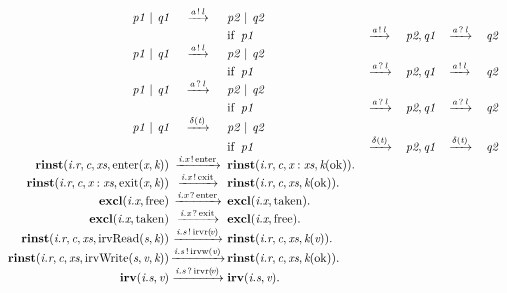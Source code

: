 \[
\begin{array}{r@{}c@{}llllll}
\Prule{\Tstep{\Tpar{\Tvar{P1}}{\Tvar{Q1}}}{\Tsay{\Tvar{A}}{\Tvar{L}}}{\Tpar{\Tvar{P2}}{\Tvar{Q2}}}}{\Tstep{\Tvar{P1}}{\Tsay{\Tvar{A}}{\Tvar{L}}}{\Tvar{P2}},\Tstep{\Tvar{Q1}}{\Thear{\Tvar{A}}{\Tvar{L}}}{\Tvar{Q2}}}
\\\Prule{\Tstep{\Tpar{\Tvar{P1}}{\Tvar{Q1}}}{\Tsay{\Tvar{A}}{\Tvar{L}}}{\Tpar{\Tvar{P2}}{\Tvar{Q2}}}}{\Tstep{\Tvar{P1}}{\Thear{\Tvar{A}}{\Tvar{L}}}{\Tvar{P2}},\Tstep{\Tvar{Q1}}{\Tsay{\Tvar{A}}{\Tvar{L}}}{\Tvar{Q2}}}
\\\Prule{\Tstep{\Tpar{\Tvar{P1}}{\Tvar{Q1}}}{\Thear{\Tvar{A}}{\Tvar{L}}}{\Tpar{\Tvar{P2}}{\Tvar{Q2}}}}{\Tstep{\Tvar{P1}}{\Thear{\Tvar{A}}{\Tvar{L}}}{\Tvar{P2}},\Tstep{\Tvar{Q1}}{\Thear{\Tvar{A}}{\Tvar{L}}}{\Tvar{Q2}}}
\\\Prule{\Tstep{\Tpar{\Tvar{P1}}{\Tvar{Q1}}}{\Tdelta{\Tvar{T}}}{\Tpar{\Tvar{P2}}{\Tvar{Q2}}}}{\Tstep{\Tvar{P1}}{\Tdelta{\Tvar{T}}}{\Tvar{P2}},\Tstep{\Tvar{Q1}}{\Tdelta{\Tvar{T}}}{\Tvar{Q2}}}
\\\Pfact{\Tstep{\Trinst{\Tr{\Tvar{R}}{\Tvar{I}}}{\Tvar{C}}{\Tvar{Xs}}{\TrteEnter{\Tvar{X}}{\Tvar{K}}}}{\Tsay{\Tx{\Tvar{X}}{\Tvar{I}}}{\Tenter}}{\Trinst{\Tr{\Tvar{R}}{\Tvar{I}}}{\Tvar{C}}{\Tcons{\Tvar{X}}{\Tvar{Xs}}}{\Tap{\Tvar{K}}{\Tok}}}}
\\\Pfact{\Tstep{\Trinst{\Tr{\Tvar{R}}{\Tvar{I}}}{\Tvar{C}}{\Tcons{\Tvar{X}}{\Tvar{Xs}}}{\TrteExit{\Tvar{X}}{\Tvar{K}}}}{\Tsay{\Tx{\Tvar{X}}{\Tvar{I}}}{\Texit}}{\Trinst{\Tr{\Tvar{R}}{\Tvar{I}}}{\Tvar{C}}{\Tvar{Xs}}{\Tap{\Tvar{K}}{\Tok}}}}
\\\Pfact{\Tstep{\Texcl{\Tx{\Tvar{X}}{\Tvar{I}}}{\Tfree}}{\Thear{\Tx{\Tvar{X}}{\Tvar{I}}}{\Tenter}}{\Texcl{\Tx{\Tvar{X}}{\Tvar{I}}}{\Ttaken}}}
\\\Pfact{\Tstep{\Texcl{\Tx{\Tvar{X}}{\Tvar{I}}}{\Ttaken}}{\Thear{\Tx{\Tvar{X}}{\Tvar{I}}}{\Texit}}{\Texcl{\Tx{\Tvar{X}}{\Tvar{I}}}{\Tfree}}}
\\\Pfact{\Tstep{\Trinst{\Tr{\Tvar{R}}{\Tvar{I}}}{\Tvar{C}}{\Tvar{Xs}}{\TrteIrvRead{\Tvar{S}}{\Tvar{K}}}}{\Tsay{\Ts{\Tvar{S}}{\Tvar{I}}}{\Tirvr{\Tvar{V}}}}{\Trinst{\Tr{\Tvar{R}}{\Tvar{I}}}{\Tvar{C}}{\Tvar{Xs}}{\Tap{\Tvar{K}}{\Tvar{V}}}}}
\\\Pfact{\Tstep{\Trinst{\Tr{\Tvar{R}}{\Tvar{I}}}{\Tvar{C}}{\Tvar{Xs}}{\TrteIrvWrite{\Tvar{S}}{\Tvar{V}}{\Tvar{K}}}}{\Tsay{\Ts{\Tvar{S}}{\Tvar{I}}}{\Tirvw{\Tvar{V}}}}{\Trinst{\Tr{\Tvar{R}}{\Tvar{I}}}{\Tvar{C}}{\Tvar{Xs}}{\Tap{\Tvar{K}}{\Tok}}}}
\\\Pfact{\Tstep{\Tirv{\Ts{\Tvar{S}}{\Tvar{I}}}{\Tvar{V}}}{\Thear{\Ts{\Tvar{S}}{\Tvar{I}}}{\Tirvr{\Tvar{V}}}}{\Tirv{\Ts{\Tvar{S}}{\Tvar{I}}}{\Tvar{V}}}}

\end{array}\]
